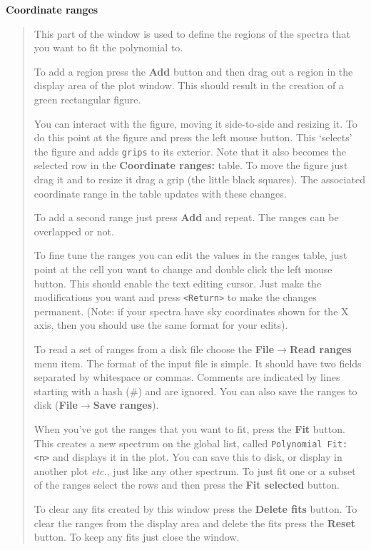 \documentclass[twoside,11pt]{article}
\newcommand{\latexhtml}[2]{#1}
\renewcommand{\_}{\texttt{\symbol{95}}}
\newcommand{\submenuitem}[2]{\latexhtml{\textbf{#1$\rightarrow$#2}}{\textbf{#1->#2}}}
\newcommand{\labelitem}[1]{\textbf{#1}}
\newcommand{\hitext}[1]{\texttt{#1}}
\newcommand{\etc}{\textit{etc.}}
\newcommand{\subheading}[1]{\textbf{\large{#1}}}
\begin{document}
\subheading{Coordinate ranges}
\begin{quote}
 This part of the window is used to define the regions of the spectra
 that you want to fit the polynomial to.

 To add a region press the \labelitem{Add} button and then drag out a
 region in the display area of the plot window. This should result in
 the creation of a green rectangular figure.

 You can interact with the figure, moving it side-to-side and resizing
 it. To do this point at the figure and press the left mouse
 button. This `selects' the figure and adds \hitext{grips} to its
 exterior. Note that it also becomes the selected row in the
 \labelitem{Coordinate ranges:} table. To move the figure just drag it
 and to resize it drag a grip (the little black squares). The
 associated coordinate range in the table updates with these changes.

 To add a second range just press \labelitem{Add} and repeat. The
 ranges can be overlapped or not.

 To fine tune the ranges you can edit the values in the ranges table,
 just point at the cell you want to change and double click the left
 mouse button. This should enable the text editing cursor. Just make
 the modifications you want and press \hitext{<Return>} to make the
 changes permanent. (Note: if your spectra have sky coordinates shown
 for the X axis, then you should use the same format for your edits).

 To read a set of ranges from a disk file choose the
 \submenuitem{File}{Read ranges} menu item. The format of the input file
 is simple. It should have two fields separated by whitespace or
 commas. Comments are indicated by lines starting with a hash (\#)
 and are ignored. You can also save the ranges to disk
 (\submenuitem{File}{Save ranges}).

 When you've got the ranges that you want to fit, press the
 \labelitem{Fit} button. This creates a new spectrum on the global
 list, called \hitext{Polynomial Fit: <n>} and displays it in the
 plot.  You can save this to disk, or display in another plot \etc,
 just like any other spectrum. To just fit one or a subset of the
 ranges select the rows and then press the \labelitem{Fit selected}
 button.

 To clear any fits created by this window press the \labelitem{Delete
 fits} button. To clear the ranges from the display area and delete the
 fits press the \labelitem{Reset} button. To keep any fits just close
 the window.
\end{quote}
\end{document}
